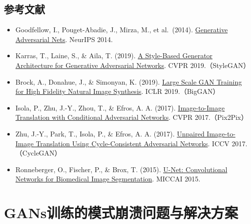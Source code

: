 \hypertarget{ux53c2ux8003ux6587ux732e-38}{%
\subsection{参考文献}\label{ux53c2ux8003ux6587ux732e-38}}

\vspace{0.25em}
\begin{itemize}
\tightlist
\item
  Goodfellow, I., Pouget-Abadie, J., Mirza, M., et al.~(2014). \href{https://papers.nips.cc/paper/5423-generative-adversarial-nets}{Generative Adversarial Nets}. NeurIPS 2014.
\item
  Karras, T., Laine, S., \& Aila, T. (2019). \href{https://openaccess.thecvf.com/content_CVPR_2019/html/Karras_A_Style-Based_Generator_Architecture_for_Generative_Adversarial_Networks_CVPR_2019_paper.html}{A Style-Based Generator Architecture for Generative Adversarial Networks}. CVPR 2019.（StyleGAN）
\item
  Brock, A., Donahue, J., \& Simonyan, K. (2019). \href{https://arxiv.org/abs/1809.11096}{Large Scale GAN Training for High Fidelity Natural Image Synthesis}. ICLR 2019.（BigGAN）
\item
  Isola, P., Zhu, J.-Y., Zhou, T., \& Efros, A. A. (2017). \href{https://openaccess.thecvf.com/content_cvpr_2017/html/Isola_Image-To-Image_Translation_With_CVPR_2017_paper.html}{Image-to-Image Translation with Conditional Adversarial Networks}. CVPR 2017.（Pix2Pix）
\item
  Zhu, J.-Y., Park, T., Isola, P., \& Efros, A. A. (2017). \href{https://openaccess.thecvf.com/content_iccv_2017/html/Zhu_Unpaired_Image-To-Image_Translation_ICCV_2017_paper.html}{Unpaired Image-to-Image Translation Using Cycle-Consistent Adversarial Networks}. ICCV 2017.（CycleGAN）
\item
  Ronneberger, O., Fischer, P., \& Brox, T. (2015). \href{https://arxiv.org/abs/1505.04597}{U-Net: Convolutional Networks for Biomedical Image Segmentation}. MICCAI 2015.
\end{itemize}

\clearpage

\hypertarget{gansux8badux7ec3ux7684ux6a21ux5f0fux5d29ux6e83ux95eeux9898ux4e0eux89e3ux51b3ux65b9ux6848}{%
\section{GANs训练的模式崩溃问题与解决方案}\label{gansux8badux7ec3ux7684ux6a21ux5f0fux5d29ux6e83ux95eeux9898ux4e0eux89e3ux51b3ux65b9ux6848}}

